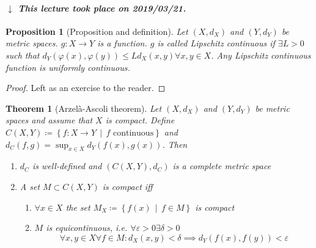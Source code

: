 \documentclass[a4paper]{article}
\newcounter{lecref}[section]
\numberwithin{lecref}{section}
\newtheorem{theorem}[lecref]{Theorem}
\newtheorem{proposition}[lecref]{Proposition}
\newcommand{\SetDef}[2]{\left\{#1\,\mid\,#2\right\}}
\newcommand{\dateref}[1]{%
  \begin{mdframed}[backgroundcolor=gray!10,innerbottommargin=0pt,innertopmargin=0pt]
    \paragraph{\textit{$\downarrow$ This lecture took place on #1.}}%
  \end{mdframed}%
}
\begin{document}
\dateref{2019/03/21}

\begin{proposition}[Proposition and definition]
	\label{proposition:1.21}
	Let $(X, d_X)$ and $(Y, d_Y)$ be metric spaces.
	$g: X \to Y$ is a function. $g$ is called \emph{Lipschitz continuous}
	if $\exists L > 0$ such that $d_Y(\varphi(x), \varphi(y)) \leq L d_X(x, y) \forall x, y \in X$.
	Any Lipschitz continuous function is uniformly continuous.
\end{proposition}

\begin{proof}
	Left as an exercise to the reader.
\end{proof}

\begin{theorem}[Arzelà-Ascoli theorem]
	\label{theorem:1.22}
	Let $(X, d_X)$ and $(Y, d_Y)$ be metric spaces and assume that $X$ is compact.
	Define $C(X, Y) \coloneqq \SetDef{f: X \to Y}{f \text{ continuous}}$ and $d_C(f, g) = \sup_{x \in X} d_Y(f(x), g(x))$.
	Then
	\begin{enumerate}
		\item $d_C$ is well-defined and $(C(X, Y), d_C)$ is a complete metric space
		\item A set $M \subset C(X, Y)$ is compact iff
			\begin{enumerate}
				\item $\forall x \in X$ the set $M_X \coloneqq \SetDef{f(x)}{f \in M}$ is compact
				\item $M$ is \emph{equicontinuous}, i.e. $\forall \varepsilon > 0 \exists \delta > 0$
					\[ \forall x, y \in X \forall f \in M: d_X(x, y) < \delta \implies d_Y(f(x), f(y)) < \varepsilon \]
			\end{enumerate}
	\end{enumerate}
\end{theorem}
\end{document}

